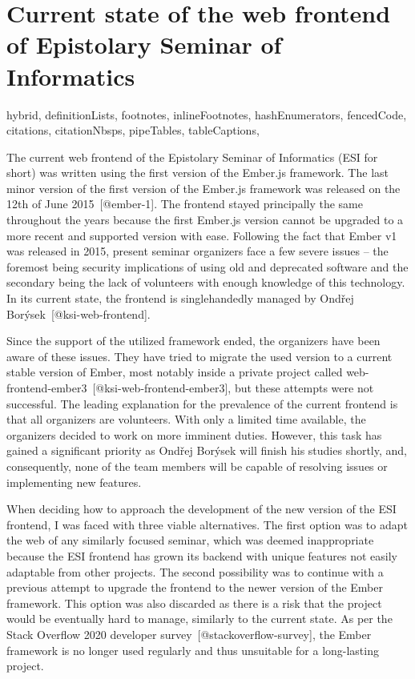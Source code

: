 \documentclass[
  digital, %
  oneside, %
  lof,     %
  lot,     %
]{fithesis4}
\begin{document}
\chapter{Current state of the web frontend of Epistolary Seminar of Informatics}
\shorthandoff{-}
\begin{markdown*}{%
  hybrid,
  definitionLists,
  footnotes,
  inlineFootnotes,
  hashEnumerators,
  fencedCode,
  citations,
  citationNbsps,
  pipeTables,
  tableCaptions,
}

The current web frontend of the Epistolary Seminar of Informatics (ESI for short) was written using the first version of the Ember.js framework. The last minor version of the first version of the Ember.js framework was released on the 12th of June 2015~[@ember-1]. The frontend stayed principally the same throughout the years because the first Ember.js version cannot be upgraded to a more recent and supported version with ease. Following the fact that Ember v1 was released in 2015, present seminar organizers face a few severe issues -- the foremost being security implications of using old and deprecated software and the secondary being the lack of volunteers with enough knowledge of this technology. In its current state, the frontend is singlehandedly managed by Ondřej Borýsek~[@ksi-web-frontend].

Since the support of the utilized framework ended, the organizers have been aware of these issues. They have tried to migrate the used version to a current stable version of Ember, most notably inside a private project called web-frontend-ember3~[@ksi-web-frontend-ember3], but these attempts were not successful. The leading explanation for the prevalence of the current frontend is that all organizers are volunteers. With only a limited time available, the organizers decided to work on more imminent duties. However, this task has gained a significant priority as Ondřej Borýsek will finish his studies shortly, and, consequently, none of the team members will be capable of resolving issues or implementing new features.

When deciding how to approach the development of the new version of the ESI frontend, I was faced with three viable alternatives. The first option was to adapt the web of any similarly focused seminar, which was deemed inappropriate because the ESI frontend has grown its backend with unique features not easily adaptable from other projects. The second possibility was to continue with a previous attempt to upgrade the frontend to the newer version of the Ember framework. This option was also discarded as there is a risk that the project would be eventually hard to manage, similarly to the current state. As per the Stack Overflow 2020 developer survey~[@stackoverflow-survey], the Ember framework is no longer used regularly and thus unsuitable for a long-lasting project.


\end{markdown*}
\end{document}
